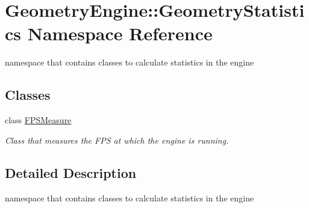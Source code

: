 \hypertarget{namespace_geometry_engine_1_1_geometry_statistics}{}\section{Geometry\+Engine\+::Geometry\+Statistics Namespace Reference}
\label{namespace_geometry_engine_1_1_geometry_statistics}


namespace that contains classes to calculate statistics in the engine  


\subsection*{Classes}
\begin{DoxyCompactItemize}
\item 
class \mbox{\hyperlink{class_geometry_engine_1_1_geometry_statistics_1_1_f_p_s_measure}{F\+P\+S\+Measure}}
\begin{DoxyCompactList}\small\item\em Class that measures the F\+PS at which the engine is running. \end{DoxyCompactList}\end{DoxyCompactItemize}


\subsection{Detailed Description}
namespace that contains classes to calculate statistics in the engine 
